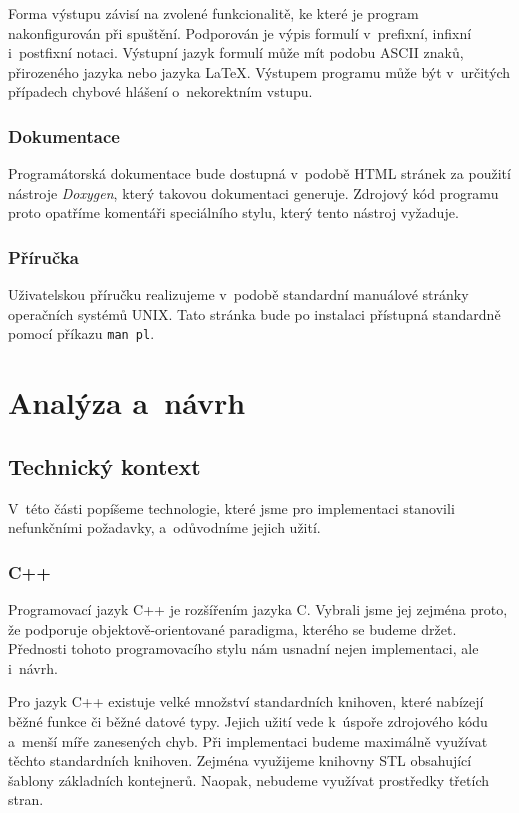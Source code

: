 \documentclass[thesis=B,czech,hidelinks]{thesis}[2012/06/26]
\begin{document}
Forma výstupu závisí na zvolené funkcionalitě, ke které je program nakonfigurován při spuštění. Podporován je výpis formulí v~prefixní, infixní i~postfixní notaci. Výstupní jazyk formulí může mít podobu ASCII znaků, přirozeného jazyka nebo jazyka \LaTeX{}. Výstupem programu může být v~určitých případech chybové hlášení o~nekorektním vstupu.

\subsection{Dokumentace}

Programátorská dokumentace bude dostupná v~podobě HTML stránek za použití nástroje \emph{Doxygen}, který takovou dokumentaci generuje. Zdrojový kód programu proto opatříme komentáři speciálního stylu, který tento nástroj vyžaduje.

\subsection{Příručka}

Uživatelskou příručku realizujeme v~podobě standardní manuálové stránky operačních systémů UNIX. Tato stránka bude po instalaci přístupná standardně pomocí příkazu \texttt{man pl}.

%
%
%

\chapter{Analýza a~návrh}

\section{Technický kontext}

V~této části popíšeme technologie, které jsme pro implementaci stanovili nefunkčními požadavky, a~odůvodníme jejich užití.

\subsection{C++}

Programovací jazyk C++ je rozšířením jazyka C. Vybrali jsme jej zejména proto, že podporuje objektově-orientované paradigma, kterého se budeme držet. Přednosti tohoto programovacího stylu nám usnadní nejen implementaci, ale i~návrh.

Pro jazyk C++ existuje velké množství standardních knihoven, které nabízejí běžné funkce či běžné datové typy. Jejich užití vede k~úspoře zdrojového kódu a~menší míře zanesených chyb. Při implementaci budeme maximálně využívat těchto standardních knihoven. Zejména využijeme knihovny STL obsahující šablony základních kontejnerů. Naopak, nebudeme využívat prostředky třetích stran.
\end{document}
